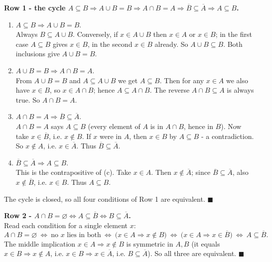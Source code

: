 \documentclass[11pt,a4paper]{article}
\begin{document}
\textbf{Row 1 - the cycle
$A\subseteq B\Rightarrow A\cup B=B\Rightarrow A\cap B=A\Rightarrow \overline{B}\subseteq\overline{A}\Rightarrow A\subseteq B$.}

\begin{enumerate}[label=(\alph*),leftmargin=1.2cm]
\item $A\subseteq B\Rightarrow A\cup B=B$.\\
Always $B\subseteq A\cup B$. Conversely, if $x\in A\cup B$ then $x\in A$ or $x\in B$; in the first
case $A\subseteq B$ gives $x\in B$, in the second $x\in B$ already. So $A\cup B\subseteq B$. Both
inclusions give $A\cup B=B$.
\item $A\cup B=B\Rightarrow A\cap B=A$.\\
From $A\cup B=B$ and $A\subseteq A\cup B$ we get $A\subseteq B$. Then for any $x\in A$ we also have
$x\in B$, so $x\in A\cap B$; hence $A\subseteq A\cap B$. The reverse $A\cap B\subseteq A$ is always
true. So $A\cap B=A$.
\item $A\cap B=A\Rightarrow \overline{B}\subseteq\overline{A}$.\\
$A\cap B=A$ says $A\subseteq B$ (every element of $A$ is in $A\cap B$, hence in $B$). Now take
$x\in\overline{B}$, i.e. $x\notin B$. If $x$ were in $A$, then $x\in B$ by $A\subseteq B$ - a
contradiction. So $x\notin A$, i.e. $x\in\overline{A}$. Thus $\overline{B}\subseteq\overline{A}$.
\item $\overline{B}\subseteq\overline{A}\Rightarrow A\subseteq B$.\\
This is the contrapositive of (c). Take $x\in A$. Then $x\notin\overline{A}$; since
$\overline{B}\subseteq\overline{A}$, also $x\notin\overline{B}$, i.e. $x\in B$. Thus
$A\subseteq B$.
\end{enumerate}
The cycle is closed, so all four conditions of Row 1 are equivalent. $\blacksquare$

\textbf{Row 2 - $A\cap B=\varnothing\Leftrightarrow A\subseteq\overline{B}\Leftrightarrow B\subseteq\overline{A}$.}\\
Read each condition for a single element $x$:
$$A\cap B=\varnothing
\ \Longleftrightarrow\ \text{no }x\text{ lies in both}
\ \Longleftrightarrow\ \bigl(x\in A\Rightarrow x\notin B\bigr)
\ \Longleftrightarrow\ \bigl(x\in A\Rightarrow x\in\overline{B}\bigr)
\ \Longleftrightarrow\ A\subseteq\overline{B}.$$
The middle implication \textquotedbl{}$x\in A\Rightarrow x\notin B$\textquotedbl{} is symmetric in
$A,B$ (it equals \textquotedbl{}$x\in B\Rightarrow x\notin A$\textquotedbl{}, i.e.
$x\in B\Rightarrow x\in\overline{A}$, i.e. $B\subseteq\overline{A}$). So all three are equivalent.
$\blacksquare$
\end{document}
